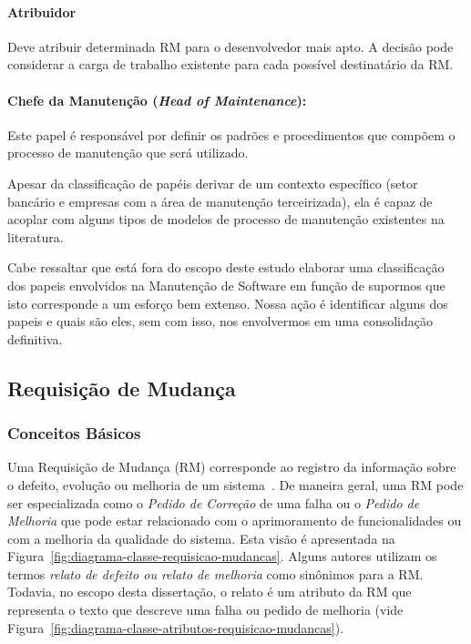 \paragraph{Atribuidor}
Deve atribuir determinada RM para o desenvolvedor mais apto. A decisão pode
considerar a carga de trabalho existente para cada possível destinatário da RM.

\paragraph{Chefe da Manutenção (\textit{Head of	Maintenance}):}
Este papel é responsável por definir os padrões e procedimentos que compõem o
processo de manutenção que será utilizado.

Apesar da classificação de papéis derivar de um contexto específico (setor
bancário e empresas com a área de manutenção terceirizada), ela é capaz de
acoplar com alguns tipos de modelos de processo de manutenção existentes na
literatura.

Cabe ressaltar que está fora do escopo deste estudo elaborar uma classificação
dos papeis envolvidos na Manutenção de Software em função de supormos que isto
corresponde a um esforço bem extenso. Nossa ação é identificar alguns dos
papeis e quais são eles, sem com isso, nos envolvermos em uma consolidação
definitiva.

\subsection{Requisição de Mudança}\label{sec:requisicao_de_mudanca}

\subsubsection{Conceitos Básicos}\label{subsec:tipos_de_requisicoes_mudanca}

Uma Requisição de Mudança (RM) corresponde ao registro da informação sobre o
defeito, evolução ou melhoria de um sistema~\cite{tripathy2014software}. De
maneira geral, uma RM pode ser especializada como o \textit{Pedido de Correção}
de uma falha ou o \textit{Pedido de Melhoria} que pode estar relacionado com o
aprimoramento de funcionalidades ou com a melhoria da qualidade do sistema. Esta
visão é apresentada na Figura~\ref{fig:diagrama-classe-requisicao-mudancas}.
Alguns autores utilizam os termos \textit{relato de defeito ou relato de
    melhoria} como sinônimos para a RM\@. Todavia, no escopo desta dissertação,
o relato é um atributo da RM que representa o texto que descreve uma falha ou
pedido de melhoria (vide
Figura~\ref{fig:diagrama-classe-atributos-requisicao-mudancas}).

